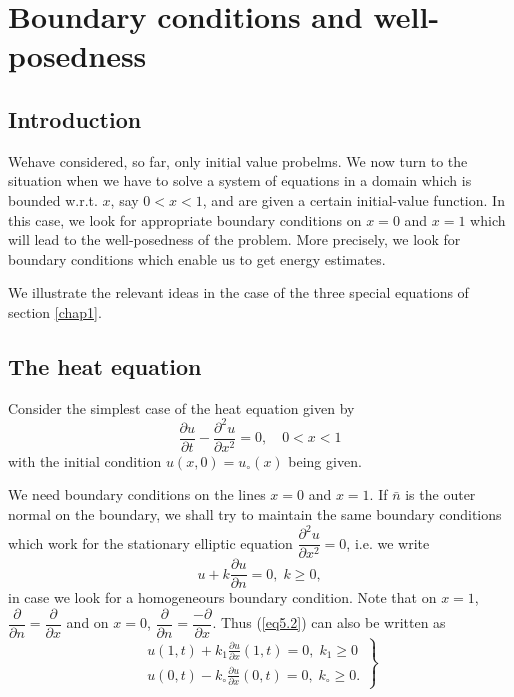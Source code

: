 
\chapter{Boundary conditions and well-posedness}\label{chap5}

\section{Introduction}\label{chap5:sec5.1}

We\pageoriginale have considered, so far, only initial value
probelms. We now turn to the situation when we have to solve a system
of equations in a domain which is bounded w.r.t. $x$, say $0 < x <
1$, and are given a certain initial-value function. In this case, we
look for appropriate boundary conditions on $x=0$ and $x =1$ which
will lead to the well-posedness of the problem. More precisely, we
look for boundary conditions which enable us to get energy estimates.

We illustrate the relevant ideas in the case of the three special
equations of section \ref{chap1}.

\section{The heat equation}\label{chap5:sec5.2}
 
Consider the simplest case of the  heat equation given by 
\begin{equation*}
\frac{\partial u}{\partial t} - \frac{\partial^2u}{\partial x^2} = 0,
\quad 0 < x < 1 \tag{5.1}\label{eq5.1}
\end{equation*}
with the initial condition $u(x,0) = u_\circ(x)$ being given.

We need boundary conditions on the lines $x =0$ and $x=1$. If
$\bar{n}$ is the outer normal on the boundary, we shall try to
maintain the same boundary conditions which work for the stationary
elliptic equation $\dfrac{\partial^2 u}{\partial x^2} =0$, i.e. we
write
\begin{equation*}
u + k \frac{\partial u}{\partial n} =0, \; k \geq 0, \tag{5.2}\label{eq5.2}
\end{equation*}
in case we look for a homogeneours boundary condition. Note that on
$x=1$, $\dfrac{\partial}{\partial n} = \dfrac{\partial}{\partial x}$ and
on $x=0$, $\dfrac{\partial}{\partial n} = \dfrac{-\partial}{\partial
  x}$. Thus (\ref{eq5.2}) can also be written as
\begin{equation*}
\left.
\begin{aligned}
u(1,t) + k_1 \frac{\partial u}{\partial x } (1,t) = 0, \; k_1 \geq 0\\
u(0 ,t) - k_\circ \frac{\partial u}{\partial x} (0,t) =0, \;
k_\circ \geq 0. \end{aligned} \right\}
\tag{5.3}\label{eq5.3}
\end{equation*}

